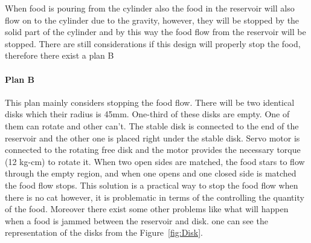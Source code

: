 When food is pouring from the cylinder also the food in the reservoir will also flow on to the cylinder due to the gravity, however, they will be stopped by the solid part of the cylinder and by this way the food flow from the reservoir will be stopped. There are still considerations if this design will properly stop the food, therefore there exist a plan B

\paragraph{Plan B}

This plan mainly considers stopping the food flow. There will be two identical disks which their radius is 45mm. One-third of these disks are empty. One of them can rotate and other can't. The stable disk is connected to the end of the reservoir and the other one is placed right under the stable disk. Servo motor is connected to the rotating free disk and the motor provides the necessary torque (12 kg-cm) to rotate it. When two open sides are matched, the food stars to flow through the empty region, and when one opens and one closed side is matched the food flow stops.  
This solution is a practical way to stop the food flow when there is no cat however, it is problematic in terms of the controlling the quantity of the food. Moreover there exist some other problems like what will happen when a food is jammed between the reservoir and disk. one can see the representation of the disks from the Figure~\ref{fig:Disk}.
\clearpage 


